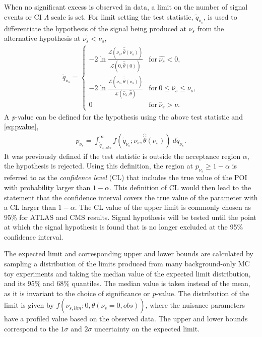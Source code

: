 When no significant excess is observed in data, a limit on the number of signal events or CI $\Lambda$ scale is set. For limit setting the test statistic, $\tilde{q}_{\nu_s}$, is used to differentiate the hypothesis of the signal being produced at $\nu_s$ from the alternative hypothesis at $\nu_s^\prime < \nu_s$,
\begin{equation}
    \label{eq:limitTestStat}
    \begin{aligned}
    \tilde{q}_{\nu_s} = \begin{cases}
        -2\ln\frac{\mathcal{L}(\nu_s,\hat{\hat{\theta}}(\nu_s))}{\mathcal{L}(0,\hat{\hat{\theta}}(0))} & \mathrm{for }~\hat{\nu_s} < 0, \\
        -2\ln\frac{\mathcal{L}(\nu_s,\hat{\hat{\theta}}(\nu_s))}{\mathcal{L}(\hat{\nu}_s,\hat{\theta})} & \mathrm{for }~0 \leq \hat{\nu}_s \leq \nu_s, \\
        0          & \mathrm{for }~\hat{\nu}_s > \nu.
    \end{cases}
    \end{aligned}
\end{equation}
A \emph{p}-value can be defined for the hypothesis using the above test statistic and \cref{eq:pvalue}, 
\begin{equation}
    \label{eq:pvalue_sb}
    \begin{aligned}
        p_{\nu_s} = \int_{\tilde{q}_{\nu_s,obs}}^\infty f(\tilde{q}_{\nu_s};\nu_s,\hat{\hat{\theta}}(\nu_s))~d\tilde{q}_{\nu_s}.
    \end{aligned}
\end{equation}
It was previously defined if the test statistic is outside the acceptance region $\alpha$, the hypothesis is rejected. Using this definition, the region at $p_{\nu_s} \geq 1 - \alpha$ is referred to as the \emph{confidence level} (CL) that includes the true value of the POI with probability larger than $1-\alpha$. This definition of CL would then lead to the statement that the confidence interval covers the true value of the parameter with a CL larger than $1-\alpha$. The CL value of the upper limit is commonly chosen as 95\% for ATLAS and CMS results. Signal hypothesis will be tested until the point at which the signal hypothesis is found that is no longer excluded at the 95\% confidence interval. 

The expected limit and corresponding upper and lower bounds are calculated by sampling a distribution of the limits produced from many background-only MC toy experiments and taking the median value of the expected limit distribution, and its 95\% and 68\% quantiles. The median value is taken instead of the mean, as it is invariant to the choice of significance or \emph{p}-value. The distribution of the limit is given by $f(\nu_{s,lim};0,\hat{\hat{\theta}}(\nu_s = 0,obs))$, where the nuisance parameters have a profiled value based on the observed data. The upper and lower bounds correspond to the $1\sigma$ and $2\sigma$ uncertainty on the expected limit.

